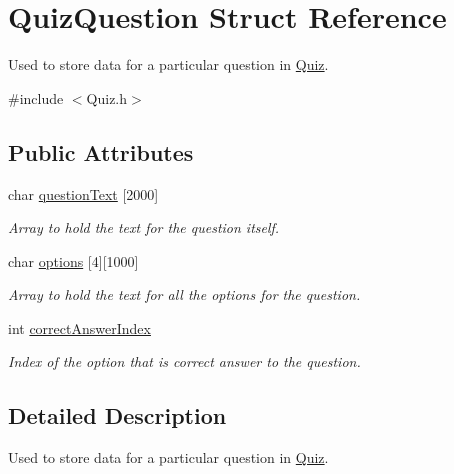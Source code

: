 \hypertarget{struct_quiz_question}{}\section{Quiz\+Question Struct Reference}
\label{struct_quiz_question}


Used to store data for a particular question in \mbox{\hyperlink{class_quiz}{Quiz}}.  




{\ttfamily \#include $<$Quiz.\+h$>$}

\subsection*{Public Attributes}
\begin{DoxyCompactItemize}
\item 
char \mbox{\hyperlink{struct_quiz_question_ac451f58d95fccbf01fdfa5a26cf44b85}{question\+Text}} \mbox{[}2000\mbox{]}
\begin{DoxyCompactList}\small\item\em Array to hold the text for the question itself. \end{DoxyCompactList}\item 
\mbox{\label{struct_quiz_question_abd75cd8f0eadca69ddddf9fa068978c2}} 
char \mbox{\hyperlink{struct_quiz_question_abd75cd8f0eadca69ddddf9fa068978c2}{options}} \mbox{[}4\mbox{]}\mbox{[}1000\mbox{]}
\begin{DoxyCompactList}\small\item\em Array to hold the text for all the options for the question. \end{DoxyCompactList}\item 
\mbox{\label{struct_quiz_question_ab7de3273b65f993a40fc2a61f7123a3e}} 
int \mbox{\hyperlink{struct_quiz_question_ab7de3273b65f993a40fc2a61f7123a3e}{correct\+Answer\+Index}}
\begin{DoxyCompactList}\small\item\em Index of the option that is correct answer to the question. \end{DoxyCompactList}\end{DoxyCompactItemize}


\subsection{Detailed Description}
Used to store data for a particular question in \mbox{\hyperlink{class_quiz}{Quiz}}. 



